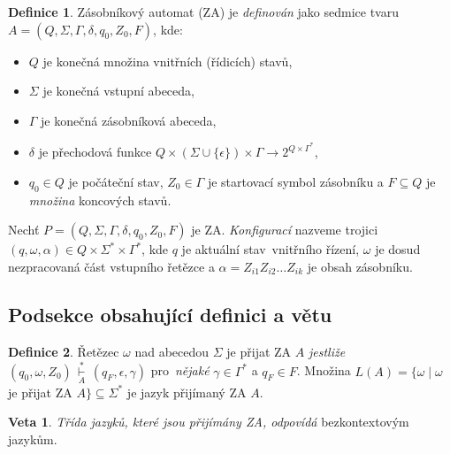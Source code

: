 \documentclass[11pt,a4paper, twocolumn]{article}
\theoremstyle{definition}
\newtheorem{Definice}{Definice}
\theoremstyle{definition}
\newtheorem{Veta}{Veta}
\begin{document}
\begin{Definice}\label{def:1}
Zásobníkový automat (ZA) je \emph{definován} jako sedmice tvaru ${ A = (Q, \Sigma, \Gamma, \delta, q_0, Z_0, F) }$, kde: 
\begin{itemize}
\setlength{\itemindent}{-0.5em}
    \item ${ Q }$ je konečná množina vnitřních (řídicích) stavů, 
    \item ${ \Sigma }$ je konečná vstupní abeceda, 
    \item ${ \Gamma }$ je konečná zásobníková abeceda, 
    \item ${ \delta }$ je přechodová funkce ${Q\times(\Sigma\cup\{\epsilon\})\times\Gamma\rightarrow 2^{Q\times\Gamma^*}}$, 
    \item $ q_0 \in Q $ je počáteční stav, ${ Z_0 \in \Gamma }$ je startovací symbol zásobníku a ${ F \subseteq Q}$ je \emph{množina} koncových stavů. 
\end{itemize}

Nechť ${ P = (Q, \Sigma, \Gamma, \delta, q_0, Z_0, F) }$  je ZA. \emph{Konfigurací} nazveme trojici ${(q, \omega, \alpha) \in Q \times \Sigma^* \times \Gamma^*}$, kde ${q}$  je aktuální stav~vnitřního řízení, ${ \omega }$  je dosud nezpracovaná část vstupního řetězce a 
${\alpha = Z_{i1} Z_{i2} \ldots Z_{ik} }$ je obsah zásobníku.
\end{Definice}

\subsection{Podsekce obsahující definici a větu}\label{sec:Podsekce obsahující definici a větu}
\begin{Definice}\label{def:2}
Řetězec ${\omega}$ nad abecedou ${\Sigma}$ je přijat ZA ${A}$ \emph{jestliže} ${(q_0, \omega, Z_0) \,  \underset{A}{\overset{\ast}{\vdash}} \, (q_F, \epsilon, \gamma)}$ pro~\emph{nějaké} ${\gamma \in \Gamma^*}$ a ${q_F \in F}$. Množina ${L(A) = \{ \omega\; |\; \omega}$ je přijat ZA ${A\} \subseteq \Sigma^*}$ je jazyk přijímaný ZA ${A}$.
\end{Definice}

\begin{Veta}\label{veta1}
\emph{Třída jazyků, které jsou přijímány ZA, odpovídá} bezkontextovým jazykům.
\end{Veta}
\end{document}
